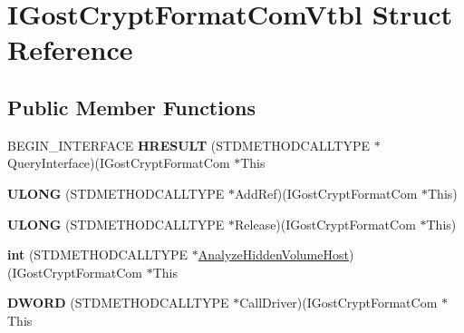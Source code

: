\hypertarget{struct_i_gost_crypt_format_com_vtbl}{}\section{I\+Gost\+Crypt\+Format\+Com\+Vtbl Struct Reference}
\label{struct_i_gost_crypt_format_com_vtbl}
\subsection*{Public Member Functions}
\begin{DoxyCompactItemize}
\item 
\mbox{\label{struct_i_gost_crypt_format_com_vtbl_a622501d1770f6fdb9b1ab60509fe434d}} 
B\+E\+G\+I\+N\+\_\+\+I\+N\+T\+E\+R\+F\+A\+CE {\bfseries H\+R\+E\+S\+U\+LT} (S\+T\+D\+M\+E\+T\+H\+O\+D\+C\+A\+L\+L\+T\+Y\+PE $\ast$Query\+Interface)(I\+Gost\+Crypt\+Format\+Com $\ast$This
\item 
\mbox{\label{struct_i_gost_crypt_format_com_vtbl_a36bb838f64db69f3942a8e5b905bbeb0}} 
{\bfseries U\+L\+O\+NG} (S\+T\+D\+M\+E\+T\+H\+O\+D\+C\+A\+L\+L\+T\+Y\+PE $\ast$Add\+Ref)(I\+Gost\+Crypt\+Format\+Com $\ast$This)
\item 
\mbox{\label{struct_i_gost_crypt_format_com_vtbl_a75cf1d598322f39479ad67a5e3c06cc8}} 
{\bfseries U\+L\+O\+NG} (S\+T\+D\+M\+E\+T\+H\+O\+D\+C\+A\+L\+L\+T\+Y\+PE $\ast$Release)(I\+Gost\+Crypt\+Format\+Com $\ast$This)
\item 
\mbox{\label{struct_i_gost_crypt_format_com_vtbl_adbfb353ab662801400f97812900257fa}} 
{\bfseries int} (S\+T\+D\+M\+E\+T\+H\+O\+D\+C\+A\+L\+L\+T\+Y\+PE $\ast$\hyperlink{_gstformat_8c_a726481439d886f8859e8442c41957719}{Analyze\+Hidden\+Volume\+Host})(I\+Gost\+Crypt\+Format\+Com $\ast$This
\item 
\mbox{\label{struct_i_gost_crypt_format_com_vtbl_a26146e72bd16b1d8a87a4ea0ecfba69e}} 
{\bfseries D\+W\+O\+RD} (S\+T\+D\+M\+E\+T\+H\+O\+D\+C\+A\+L\+L\+T\+Y\+PE $\ast$Call\+Driver)(I\+Gost\+Crypt\+Format\+Com $\ast$This
\item 
\mbox{\label{struct_i_gost_crypt_format_com_vtbl_a49f6a65fd8c6d0f4ef9d23e0a85e39a3}} 

\end{DoxyCompactItemize}
